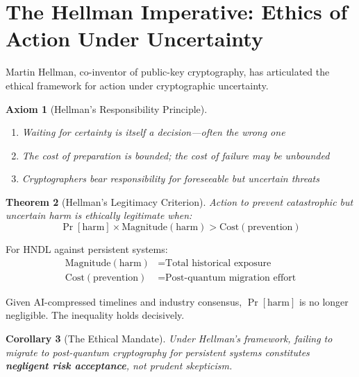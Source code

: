 \documentclass[11pt,a4paper]{article}
\newtheorem{theorem}{Theorem}[section]
\newtheorem{corollary}[theorem]{Corollary}
\newtheorem{axiom}[theorem]{Axiom}
\begin{document}
\section{The Hellman Imperative: Ethics of Action Under Uncertainty}

Martin Hellman, co-inventor of public-key cryptography, has articulated the ethical framework for action under cryptographic uncertainty.

\begin{axiom}[Hellman's Responsibility Principle]
\begin{enumerate}[noitemsep]
    \item Waiting for certainty is itself a decision---often the wrong one
    \item The cost of preparation is bounded; the cost of failure may be unbounded
    \item Cryptographers bear responsibility for foreseeable but uncertain threats
\end{enumerate}
\end{axiom}

\begin{theorem}[Hellman's Legitimacy Criterion]
Action to prevent catastrophic but uncertain harm is ethically legitimate when:
\begin{equation}
\Pr[\text{harm}] \times \text{Magnitude}(\text{harm}) > \text{Cost}(\text{prevention})
\end{equation}
\end{theorem}

For HNDL against persistent systems:
\begin{align}
\text{Magnitude}(\text{harm}) &= \text{Total historical exposure} \\
\text{Cost}(\text{prevention}) &= \text{Post-quantum migration effort}
\end{align}

Given AI-compressed timelines and industry consensus, $\Pr[\text{harm}]$ is no longer negligible. The inequality holds decisively.

\begin{corollary}[The Ethical Mandate]
Under Hellman's framework, failing to migrate to post-quantum cryptography for persistent systems constitutes \textbf{negligent risk acceptance}, not prudent skepticism.
\end{corollary}

\end{document}
